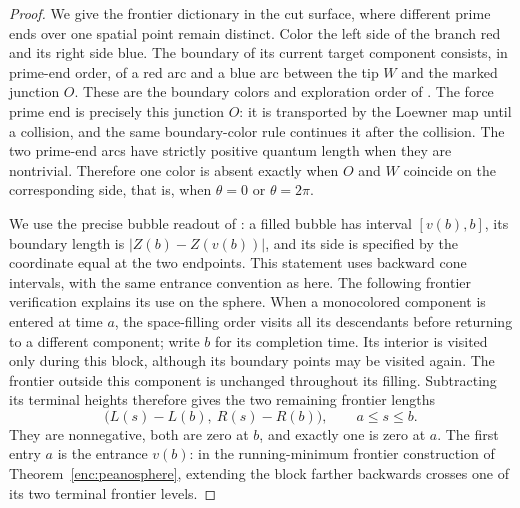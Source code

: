 \begin{proof}
We give the frontier dictionary in the cut surface, where different
prime ends over one spatial point remain distinct.  Color the left
side of the branch red and its right side blue.  The boundary of its
current target component consists, in prime-end order, of a red arc
and a blue arc between the tip $W$ and the marked junction $O$.
These are the boundary colors and exploration order of
\cite[Section~2.1.7 and Figure~9]{AruHoldenPowellSunCritical}.
The force prime end is precisely this junction $O$: it is transported
by the Loewner map until a collision, and the same boundary-color rule
continues it after the collision.  The two prime-end arcs have strictly
positive quantum length when they are nontrivial.  Therefore one color
is absent exactly when $O$ and $W$ coincide on the corresponding side,
that is, when $\theta=0$ or $\theta=2\pi$.

We use the precise bubble readout of
\cite[Section~2.3.4, Definition~2.2 and Figure~4; Lemma~3.1]
{GwynneMillerSLECharacterization}: a filled bubble has interval
$[v(b),b]$, its boundary length is $|Z(b)-Z(v(b))|$, and its side
is specified by the coordinate equal at the two endpoints.  This
statement uses backward cone intervals, with the same entrance
convention as here.  The following frontier verification explains
its use on the sphere.  When a
monocolored component is entered at time $a$, the space-filling order
visits all its descendants before returning to a different component;
write $b$ for its completion time.  Its interior is visited only during
this block, although its boundary points may be visited again.
The frontier outside this component
is unchanged throughout its filling.  Subtracting its terminal heights
therefore gives the two remaining frontier lengths
\begin{equation}\label{loop:frontier-lengths}
 \bigl(L(s)-L(b),\ R(s)-R(b)\bigr),\qquad a\le s\le b.
\end{equation}
They are nonnegative, both are zero at $b$, and exactly one is zero
at $a$.  The first entry $a$ is the entrance $v(b)$: in the
running-minimum frontier construction of
Theorem~\ref{enc:peanosphere}, extending the block farther backwards
crosses one of its two terminal frontier levels.


\end{proof}
